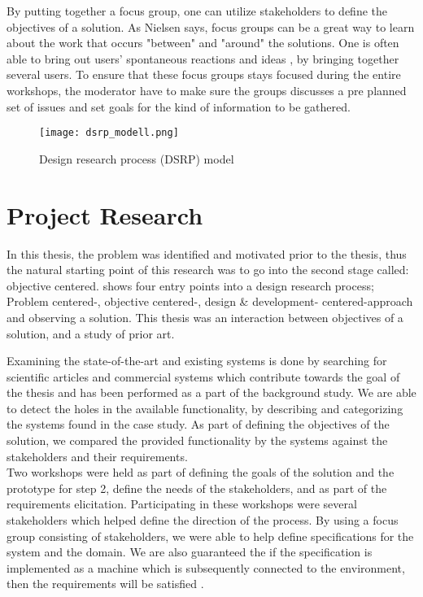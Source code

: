 By putting together a focus group, one can utilize stakeholders to define the
objectives of a solution. As Nielsen \cite{FocusGroupstoStudyWorkPractice} 
says, focus groups can be a great way to learn about the work that occurs 
"between" and "around" the solutions. One is often able to bring out users' 
spontaneous reactions and ideas \cite{nielsen1997use}, by bringing together 
several users. To ensure that these focus groups stays focused during the 
entire workshops, the moderator have to make sure the groups discusses a pre 
planned set of issues and set goals for the kind of information to be gathered.


\begin{figure}[!htbp]
	\texttt{[image: dsrp\_modell.png]}
	\caption[Design science research process (DSRP) model]{Design research process (DSRP)
	model\cite{peffers2006design}}
	\label{fig:DSRP}
\end{figure}



\section{Project Research} %
\label{sec:workshops}
In this thesis, the problem was 
identified and motivated prior to the thesis, thus the natural starting 
point of this research was to go into the second stage called: objective 
centered.  shows four entry points into a design 
research process; Problem centered-, objective centered-, design \& development-
centered-approach and observing a solution. This thesis was an interaction 
between objectives of a solution, and a study of prior art.

Examining the state-of-the-art and existing systems is done by searching for
scientific articles and commercial systems which contribute towards the goal 
of the thesis and has been performed as a part of the background study.
We are able to detect the holes in the available functionality, by describing
and categorizing the systems found in the case study. As part of defining the
objectives of the solution, we compared the provided functionality by the
systems against the stakeholders and their requirements.\\

Two workshops were held as part of defining the goals of the solution and the prototype for step 2, define the needs of the stakeholders, and as part of the requirements elicitation. Participating in these workshops were 
several stakeholders which helped define the direction of the process. By using 
a focus group consisting of stakeholders, we were able to help define 
specifications for the system and the domain. We are also guaranteed the if 
the specification is implemented as a machine which is subsequently connected 
to the environment, then the requirements will be satisfied \cite{zave1997four}. 


